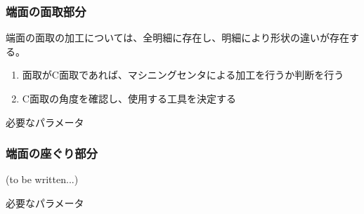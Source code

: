 \subsubsection{端面の面取部分}
端面の面取の加工については、全明細に存在し、明細により形状の違いが存在する。
\begin{enumerate}
\item 面取がC面取であれば、マシニングセンタによる加工を行うか判断を行う
\item {}C面取の角度を確認し、使用する工具を決定する
\end{enumerate}
\begin{Parameter}{必要なパラメータ}
\end{Parameter}

\subsubsection{端面の座ぐり部分\TBW}
(to be written...)
\begin{Parameter}{必要なパラメータ}
\end{Parameter}


\clearpage
